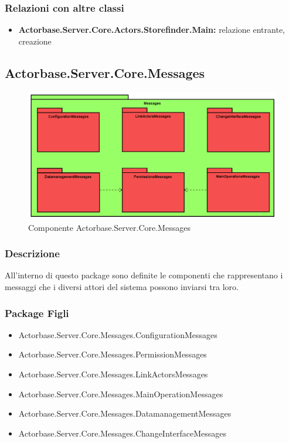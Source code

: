 \documentclass[a4paper]{article}
\begin{document}
			\subsubsection{Relazioni con altre classi}
			\begin{itemize}
				\item \textbf{Actorbase.Server.Core.Actors.Storefinder.Main:} relazione entrante, creazione
			\end{itemize}
		
		\subsection{Actorbase.Server.Core.Messages}
			\begin{figure} [H]
			\centering
			\includegraphics[scale=0.55]{Server/Package/MessagesLevel.png}
			\caption{Componente Actorbase.Server.Core.Messages}
			\end{figure}
			\subsubsection{Descrizione}
				All'interno di questo package sono definite le componenti che rappresentano i messaggi che i diversi attori del sistema possono inviarsi tra loro.
			\subsubsection{Package Figli}
			\begin{itemize}
				\item Actorbase.Server.Core.Messages.ConfigurationMessages
				\item Actorbase.Server.Core.Messages.PermissionMessages
				\item Actorbase.Server.Core.Messages.LinkActorsMessages
				\item Actorbase.Server.Core.Messages.MainOperationMessages
				\item Actorbase.Server.Core.Messages.DatamanagementMessages
				\item Actorbase.Server.Core.Messages.ChangeInterfaceMessages
			\end{itemize}
			
\end{document}
